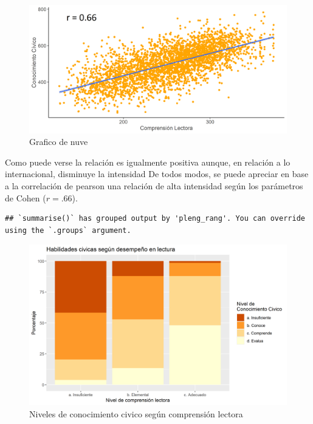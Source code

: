 \documentclass[12pt,twoside]{templates/facsothesis}
\begin{document}
\begin{figure}[!ht]

{\centering \includegraphics[width=0.8\linewidth,]{images/scater} 

}

\caption{Grafico de nuve}\label{fig:unnamed-chunk-10}
\end{figure}

Como puede verse la relación es igualmente positiva aunque, en relación a lo internacional, disminuye la intensidad De todos modos, se puede apreciar en base a la correlación de pearson una relación de alta intensidad según los parámetros de Cohen (\(r= .66\)).

\begin{verbatim}
## `summarise()` has grouped output by 'pleng_rang'. You can override using the `.groups` argument.
\end{verbatim}

\begin{figure}[!ht]

{\centering \includegraphics[width=0.8\linewidth,]{images/graficobivariadocategorico} 

}

\caption{Niveles de conocimiento civico según comprensión lectora}\label{fig:unnamed-chunk-12}
\end{figure}
\end{document}
